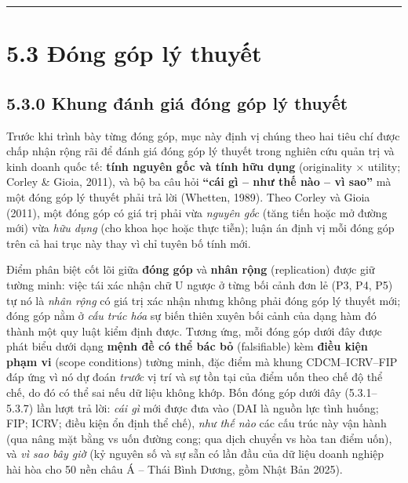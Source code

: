 \documentclass[
  a4paper,
  13pt]{extreport}
\begin{document}
\begin{center}\rule{0.5\linewidth}{0.5pt}\end{center}

\hypertarget{ux111uxf3ng-guxf3p-luxfd-thuyux1ebft}{%
\section{5.3 Đóng góp lý
thuyết}\label{ux111uxf3ng-guxf3p-luxfd-thuyux1ebft}}

\hypertarget{khung-ux111uxe1nh-giuxe1-ux111uxf3ng-guxf3p-luxfd-thuyux1ebft}{%
\subsection{5.3.0 Khung đánh giá đóng góp lý
thuyết}\label{khung-ux111uxe1nh-giuxe1-ux111uxf3ng-guxf3p-luxfd-thuyux1ebft}}

Trước khi trình bày từng đóng góp, mục này định vị chúng theo hai tiêu
chí được chấp nhận rộng rãi để đánh giá đóng góp lý thuyết trong nghiên
cứu quản trị và kinh doanh quốc tế: \textbf{tính nguyên gốc và tính hữu
dụng} (originality × utility; Corley \& Gioia, 2011), và bộ ba câu hỏi
\textbf{``cái gì -- như thế nào -- vì sao''} mà một đóng góp lý thuyết
phải trả lời (Whetten, 1989). Theo Corley và Gioia (2011), một đóng góp
có giá trị phải vừa \emph{nguyên gốc} (tăng tiến hoặc mở đường mới) vừa
\emph{hữu dụng} (cho khoa học hoặc thực tiễn); luận án định vị mỗi đóng
góp trên cả hai trục này thay vì chỉ tuyên bố tính mới.

Điểm phân biệt cốt lõi giữa \textbf{đóng góp} và \textbf{nhân rộng}
(replication) được giữ tường minh: việc tái xác nhận chữ U ngược ở từng
bối cảnh đơn lẻ (P3, P4, P5) tự nó là \emph{nhân rộng} có giá trị xác
nhận nhưng không phải đóng góp lý thuyết mới; đóng góp nằm ở \emph{cấu
trúc hóa} sự biến thiên xuyên bối cảnh của dạng hàm đó thành một quy
luật kiểm định được. Tương ứng, mỗi đóng góp dưới đây được phát biểu
dưới dạng \textbf{mệnh đề có thể bác bỏ} (falsifiable) kèm \textbf{điều
kiện phạm vi} (scope conditions) tường minh, đặc điểm mà khung
CDCM--ICRV--FIP đáp ứng vì nó dự đoán \emph{trước} vị trí và sự tồn tại
của điểm uốn theo chế độ thể chế, do đó có thể sai nếu dữ liệu không
khớp. Bốn đóng góp dưới đây (5.3.1--5.3.7) lần lượt trả lời: \emph{cái
gì} mới được đưa vào (DAI là nguồn lực tình huống; FIP; ICRV; điều kiện
ổn định thể chế), \emph{như thế nào} các cấu trúc này vận hành (qua nâng
mặt bằng vs uốn đường cong; qua dịch chuyển vs hòa tan điểm uốn), và
\emph{vì sao bây giờ} (kỷ nguyên số và sự sẵn có lần đầu của dữ liệu
doanh nghiệp hài hòa cho 50 nền châu Á -- Thái Bình Dương, gồm Nhật Bản
2025).
\end{document}

